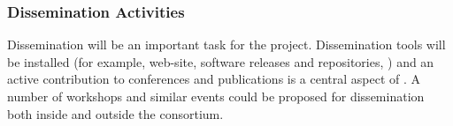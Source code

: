 %    

\subsubsection*{Dissemination Activities}
\label{sec:diss}

Dissemination will be an important task for the \Project{} project. Dissemination tools will be installed (for example, web-site, software releases and repositories, \etc) and an active contribution to conferences and publications is a central aspect of \Project{}. A number of workshops and similar events could be proposed for dissemination both inside and outside the consortium.




